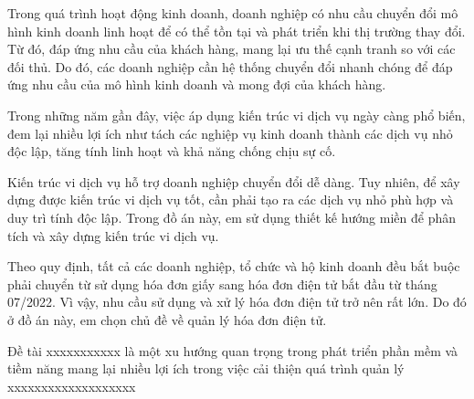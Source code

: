 Trong quá trình hoạt động kinh doanh, doanh nghiệp có nhu cầu chuyển đổi mô hình kinh doanh linh hoạt để có thể tồn tại và phát triển khi thị trường thay đổi. Từ đó, đáp ứng nhu cầu của khách hàng, mang lại ưu thế cạnh tranh so với các đối thủ. Do đó, các doanh nghiệp cần hệ thống chuyển đổi nhanh chóng để đáp ứng nhu cầu của mô hình kinh doanh và mong đợi của khách hàng.

Trong những năm gần đây, việc áp dụng kiến trúc vi dịch vụ ngày càng phổ biến, đem lại nhiều lợi ích như tách các nghiệp vụ kinh doanh thành các dịch vụ nhỏ độc lập, tăng tính linh hoạt và khả năng chống chịu sự cố.

Kiến trúc vi dịch vụ   hỗ trợ doanh nghiệp chuyển đổi dễ dàng. Tuy nhiên, để xây dựng được kiến trúc vi dịch vụ tốt, cần phải tạo ra các dịch vụ nhỏ phù hợp và duy trì tính độc lập. Trong đồ án này, em sử dụng thiết kế hướng miền để phân tích và xây dựng kiến trúc vi dịch vụ. 


 Theo quy định, tất cả các doanh nghiệp, tổ chức và hộ kinh doanh đều bắt buộc phải chuyển từ sử dụng hóa đơn giấy sang hóa đơn điện tử bắt đầu từ tháng 07/2022. Vì vậy, nhu cầu sử dụng và xử lý hóa đơn điện tử trở nên rất lớn. Do đó ở đồ án này, em chọn chủ đề về quản lý hóa đơn điện tử.

Đề tài xxxxxxxxxxx là một xu hướng quan trọng trong phát triển phần mềm và tiềm năng mang lại nhiều lợi ích trong việc cải thiện quá trình quản lý xxxxxxxxxxxxxxxxxxx